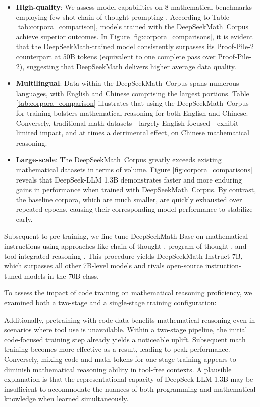 \begin{itemize}[topsep=0pt]
    \item \textbf{High-quality}:
    We assess model capabilities on 8 mathematical benchmarks employing few-shot chain-of-thought prompting \cite{cot}. According to Table \ref{tab:corpora_comparison}, models trained with the DeepSeekMath~Corpus achieve superior outcomes. In Figure \ref{fig:corpora_comparisons}, it is evident that the DeepSeekMath-trained model consistently surpasses its Proof-Pile-2 counterpart at 50B tokens (equivalent to one complete pass over Proof-Pile-2), suggesting that DeepSeekMath delivers higher average data quality.
    \item \textbf{Multilingual}:
    Data within the DeepSeekMath~Corpus spans numerous languages, with English and Chinese comprising the largest portions. Table \ref{tab:corpora_comparison} illustrates that using the DeepSeekMath~Corpus for training bolsters mathematical reasoning for both English and Chinese. Conversely, traditional math datasets—largely English-focused—exhibit limited impact, and at times a detrimental effect, on Chinese mathematical reasoning.
    \item \textbf{Large-scale}:
    The DeepSeekMath~Corpus greatly exceeds existing mathematical datasets in terms of volume. Figure \ref{fig:corpora_comparisons} reveals that DeepSeek-LLM 1.3B demonstrates faster and more enduring gains in performance when trained with DeepSeekMath~Corpus. By contrast, the baseline corpora, which are much smaller, are quickly exhausted over repeated epochs, causing their corresponding model performance to stabilize early.
\end{itemize}

Subsequent to pre-training, we fine-tune DeepSeekMath-Base on mathematical instructions using approaches like chain-of-thought \citep{cot}, program-of-thought \citep{pot,pal}, and tool-integrated reasoning \citep{tora}. This procedure yields DeepSeekMath-Instruct 7B, which surpasses all other 7B-level models and rivals open-source instruction-tuned models in the 70B class.

To assess the impact of code training on mathematical reasoning proficiency, we examined both a two-stage and a single-stage training configuration:

Additionally, pretraining with code data benefits mathematical reasoning even in scenarios where tool use is unavailable. Within a two-stage pipeline, the initial code-focused training step already yields a noticeable uplift. Subsequent math training becomes more effective as a result, leading to peak performance. Conversely, mixing code and math tokens for one-stage training appears to diminish mathematical reasoning ability in tool-free contexts. A plausible explanation is that the representational capacity of DeepSeek-LLM 1.3B may be insufficient to accommodate the nuances of both programming and mathematical knowledge when learned simultaneously.

